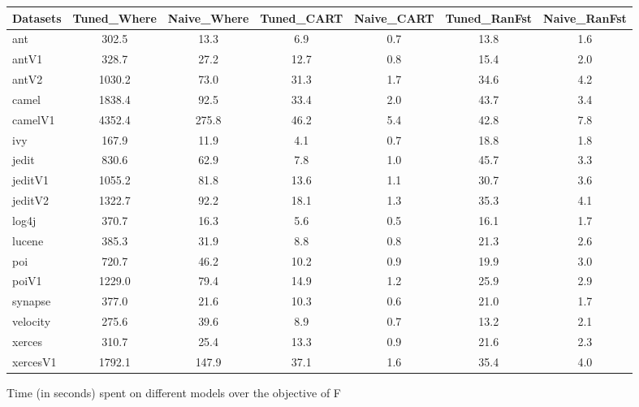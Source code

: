 \documentclass{sig-alternative}
\begin{document}
\begin{figure}[!ht]
\scriptsize
\centering
  \begin{tabular}{l|c |c |c |c |c |c }
    \hline\hline
    Datasets & Tuned\_Where & Naive\_Where & Tuned\_CART & Naive\_CART & Tuned\_RanFst & Naive\_RanFst\\
    \hline
    ant & 302.5 & 13.3 & 6.9 & 0.7 & 13.8 & 1.6\\
    antV1 & 328.7 & 27.2 & 12.7 & 0.8 & 15.4 & 2.0\\
    antV2 & 1030.2 & 73.0 & 31.3 & 1.7 & 34.6 & 4.2\\
    camel & 1838.4 & 92.5 & 33.4 & 2.0 & 43.7 & 3.4\\
    camelV1 & 4352.4 & 275.8 & 46.2 & 5.4 & 42.8 & 7.8\\
    ivy & 167.9 & 11.9 & 4.1 & 0.7 & 18.8 & 1.8\\
    jedit & 830.6 & 62.9 & 7.8 & 1.0 & 45.7 & 3.3\\
    jeditV1 & 1055.2 & 81.8 & 13.6 & 1.1 & 30.7 & 3.6\\
    jeditV2 & 1322.7 & 92.2 & 18.1 & 1.3 & 35.3 & 4.1\\
    log4j & 370.7 & 16.3 & 5.6 & 0.5 & 16.1 & 1.7\\
    lucene & 385.3 & 31.9 & 8.8 & 0.8 & 21.3 & 2.6\\
    poi & 720.7 & 46.2 & 10.2 & 0.9 & 19.9 & 3.0\\
    poiV1 & 1229.0 & 79.4 & 14.9 & 1.2 & 25.9 & 2.9\\
    synapse & 377.0 & 21.6 & 10.3 & 0.6 & 21.0 & 1.7\\
    velocity & 275.6 & 39.6 & 8.9 & 0.7 & 13.2 & 2.1\\
    xerces & 310.7 & 25.4 & 13.3 & 0.9 & 21.6 & 2.3\\
    xercesV1 & 1792.1 & 147.9 & 37.1 & 1.6 & 35.4 & 4.0\\
  \end{tabular}
  \caption{Time (in seconds) spent on different models over the objective of F}
\end{figure}
\end{document}
